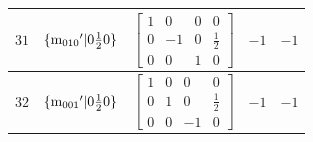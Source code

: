\documentclass[fleqn,8pt]{jsarticle}
\begin{document}
\begin{longtable}{ccccc}
$ 31 $ & $ \{{\rm m}_{010}{}'|0 \frac{1}{2} 0\} $ & $ \begin{bmatrix} 1 & 0 & 0 & 0 \\ 0 & -1 & 0 & \frac{1}{2} \\ 0 & 0 & 1 & 0 \end{bmatrix} $ & $ -1 $ & $ -1 $ \\ \hline
$ 32 $ & $ \{{\rm m}_{001}{}'|0 \frac{1}{2} 0\} $ & $ \begin{bmatrix} 1 & 0 & 0 & 0 \\ 0 & 1 & 0 & \frac{1}{2} \\ 0 & 0 & -1 & 0 \end{bmatrix} $ & $ -1 $ & $ -1 $ \\
\end{longtable}
\end{document}

